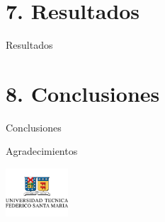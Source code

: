 \documentclass[mathserif]{beamer}
\begin{document}
\section{7. Resultados}
\begin{frame}{Resultados}
\end{frame}

\section{8. Conclusiones}
\begin{frame}{Conclusiones}
\end{frame}

\begin{frame}{Agradecimientos}
\end{frame}


\begin{frame}
	\begin{center} \includegraphics[height=1.8cm]{utfsm_logo} \end{center}
	\vspace{-1cm}
	\titlepage
\end{frame}
\end{document}
